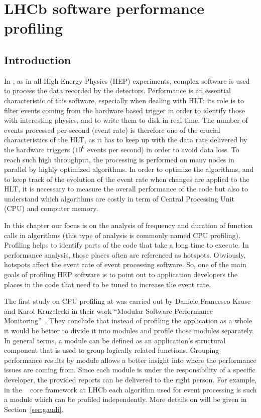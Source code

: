 \chapter{LHCb software performance profiling}
\section{Introduction}

In \lhcb, as in all High Energy Physics (HEP) experiments, complex software is
used to process the data recorded by the detectors. Performance is an essential
characteristic of this software, especially when dealing with HLT: its role is
to filter events coming from the hardware based trigger in order to identify
those with interesting physics, and to write them to disk in real-time. The
number of events processed per second (event rate) is therefore one of the
crucial characteristics of the HLT, as it has to keep up with the data rate
delivered by the hardware triggers ($10^6$ events per second) in order to avoid
data loss. To reach such high throughput, the processing is performed on many
nodes in parallel by highly optimized algorithms. In order to optimize the
algorithms, and to keep track of the evolution of the event rate when changes
are applied to the HLT, it is necessary to measure the overall performance of
the code but also to understand which algorithms are costly in term of Central
Processing Unit (CPU) and computer memory.

In this chapter our focus is on the analysis of frequency and duration of
function calls in algorithms (this type of analysis is commonly named CPU
profiling). Profiling helps to identify parts of the code that take a long time
to execute. In performance analysis, those places often are referenced as
hotspots. Obviously,  hotspots affect the event rate of event processing
software. So, one of the main goals of profiling HEP software is to point out
to application developers the places in the code that need to be tuned to
increase the event rate.

The first study on CPU profiling at \lhcb was carried out by Daniele Francesco
Kruse and Karol Kruzelecki in their work ``Modular Software Performance
Monitoring''~\cite{modular}. They conclude that instead of profiling the
application as a whole it would be better to divide it into modules and profile
those modules separately. In general terms, a module can be defined as an
application's structural component that is used to group logically related
functions.  Grouping performance results by module allows a better insight into
where the performance issues are coming from. Since each module is under the
responsibility of a specific developer, the provided reports can be delivered
to the right person. For example, in the \gaudi~\cite{Barrand:2001ny} core
framework at LHCb each algorithm used for event processing is such a module
which can be profiled independently. More details on \gaudi will be given in
Section~\ref{sec:gaudi}.

